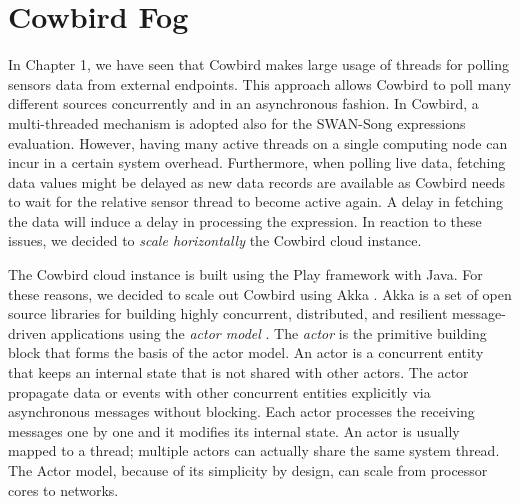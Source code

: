 \section{Cowbird Fog}
In Chapter 1, we have seen that Cowbird makes large usage of threads for polling sensors data from external endpoints. This approach allows Cowbird to poll many different sources concurrently and in an asynchronous fashion. In Cowbird, a multi-threaded mechanism is adopted also for the SWAN-Song expressions evaluation. However, having many active threads on a single computing node can incur in a certain system overhead. Furthermore, when polling live data, fetching data values might be delayed as new data records are available as Cowbird needs to wait for the relative sensor thread to become active again. A delay in fetching the data will induce a delay in processing the expression. In reaction to these issues, we decided to \emph{scale horizontally} the Cowbird cloud instance. 

The Cowbird cloud instance is built using the Play framework with Java. For these reasons, we decided to scale out Cowbird using Akka \cite{akkaonline}. Akka is a set of open source libraries for building highly concurrent, distributed, and resilient message-driven applications using the \emph{actor model} \cite{actormodelbook}. The \emph{actor} is the primitive building block that forms the basis of the actor model. An actor is a concurrent entity that keeps an internal state that is not shared with other actors. The actor propagate data or events with other concurrent entities explicitly via asynchronous messages without blocking. Each actor processes the receiving messages one by one and it modifies its internal state. An actor is usually mapped to a thread; multiple actors can actually share the same system thread. The Actor model, because of its simplicity by design, can scale from processor cores to networks.

